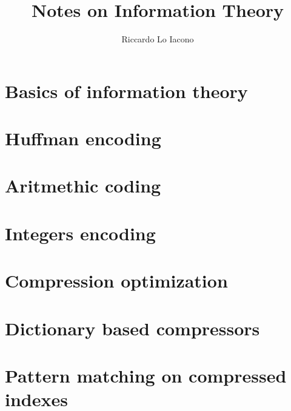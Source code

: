 \documentclass[moon, draft]{lectures2}
\title{Notes on Information Theory}
\author{Riccardo Lo Iacono}
\begin{document}
    \maketitle

    \section{Basics of information theory} 
    

    \section{Huffman encoding}
    

    \section{Aritmethic coding}
    

    \section{Integers encoding}
    

    \section{Compression optimization}
    

    \section{Dictionary based compressors}
    

    \section{Pattern matching on compressed indexes}
    

    \printbibliography
    \printglossaries
\end{document}
